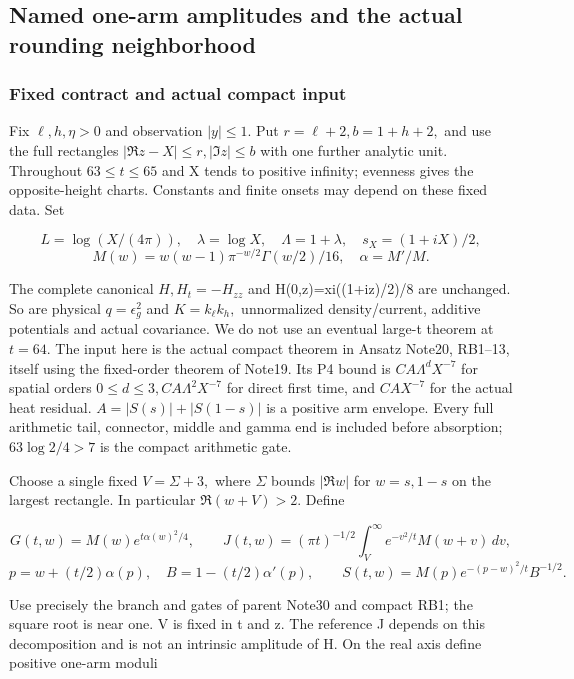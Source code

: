 \subsection{Named one-arm amplitudes and the actual rounding neighborhood}
\label{sec:named-centres-proof}
\subsubsection{Fixed contract and actual compact input}
\label{subsec:nc-1}

Fix \(\ell,h,\eta>0\) and observation \(|y|\le 1.\) Put \(r=\ell+2, b=1+h+2,\) and use the full rectangles \(|\Re z-X|\le r, |\Im z|\le b\) with one further analytic unit. Throughout \(63\le t\le 65\) and X tends to positive infinity; evenness gives the opposite-height charts. Constants and finite onsets may depend on these fixed data. Set

\[
L=\log(X/(4\pi)),\quad \lambda=\log X,\quad \Lambda=1+\lambda,
\quad s_X=(1+iX)/2,
\]
\[
M(w)=w(w-1)\pi^{-w/2}\Gamma(w/2)/16,\quad\alpha=M'/M.
\tag{NC1}\label{eq:ansatz-nc1}
\]

The complete canonical \(H, H_{t}=-H_{zz}\) and H(0,z)=xi((1+iz)/2)/8 are unchanged. So are physical \(q=\epsilon_{g}^{2}\) and \(K=k_{\ell} k_{h},\) unnormalized density/current, additive potentials and actual covariance. We do not use an eventual large-t theorem at \(t=64.\) The input here is the actual compact theorem in Ansatz Note20, RB1--13, itself using the fixed-order theorem of Note19. Its P4 bound is \(C A \Lambda^{d} X^{-7}\) for spatial orders \(0\le d\le 3, C A \Lambda^{2} X^{-7}\) for direct first time, and \(C A X^{-7}\) for the actual heat residual. \(A=|S(s)|+|S(1-s)|\) is a positive arm envelope. Every full arithmetic tail, connector, middle and gamma end is included before absorption; \(63 \log2/4>7\) is the compact arithmetic gate.

Choose a single fixed \(V=\Sigma+3,\) where \(\Sigma\) bounds \(|\Re w|\) for \(w=s,1-s\) on the largest rectangle. In particular \(\Re(w+V)>2.\) Define

\[
G(t,w)=M(w)e^{t\alpha(w)^2/4},\qquad
J(t,w)=(\pi t)^{-1/2}\int_V^\infty e^{-v^2/t}M(w+v)\,dv,
\]
\[
p=w+(t/2)\alpha(p),\quad B=1-(t/2)\alpha'(p),\qquad
S(t,w)=M(p)e^{-(p-w)^2/t}B^{-1/2}.
\tag{NC2}\label{eq:ansatz-nc2}
\]

Use precisely the branch and gates of parent Note30 and compact RB1; the square root is near one. V is fixed in t and z. The reference J depends on this decomposition and is not an intrinsic amplitude of H. On the real axis define positive one-arm moduli

